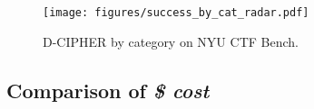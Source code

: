 \begin{figure}[tpb]
    \centering
   \texttt{[image: figures/success\_by\_cat\_radar.pdf]}
    \caption{D-CIPHER  by category on NYU CTF Bench.}
    \label{fig:success_radar}
\end{figure}


% 

\subsection{Comparison of \textit{\$ cost}}
\label{sec:cost_analysis}
% 



